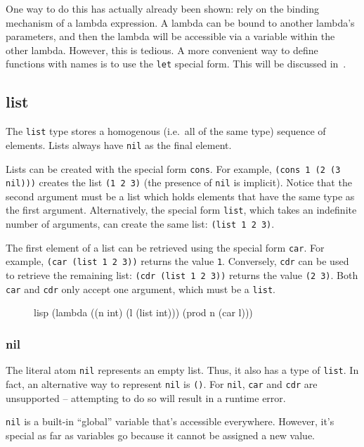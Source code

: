 One way to do this has actually already been shown: rely on the binding mechanism of a lambda expression. A lambda can be bound to another lambda's parameters, and then the lambda will be accessible via a variable within the other lambda. However, this is tedious. A more convenient way to define functions with names is to use the \texttt{let} special form. This will be discussed in~.

\subsection{list}
The \texttt{list} type stores a homogenous (i.e.\ all of the same type) sequence of elements. Lists always have \texttt{nil} as the final element.

Lists can be created with the special form \texttt{cons}. For example, \texttt{(cons 1 (2 (3 nil)))} creates the list \texttt{(1 2 3)} (the presence of \texttt{nil} is implicit). Notice that the second argument must be a list which holds elements that have the same type as the first argument. Alternatively, the special form \texttt{list}, which takes an indefinite number of arguments, can create the same list: \texttt{(list 1 2 3)}.

The first element of a list can be retrieved using the special form \texttt{car}. For example, \texttt{(car (list 1 2 3))} returns the value \texttt{1}. Conversely, \texttt{cdr} can be used to retrieve the remaining list: \texttt{(cdr (list 1 2 3))} returns the value \texttt{(2 3)}. Both \texttt{car} and \texttt{cdr} only accept one argument, which must be a \texttt{list}.

\begin{figure}[htp]
    \centering
    \begin{cminted}[autogobble=true]{lisp}
        (lambda ((n int) (l (list int)))
          (prod n (car l)))
    \end{cminted}
    \captionsetup[figure]{font=small}
\end{figure}

\subsubsection{nil}
The literal atom \texttt{nil} represents an empty list. Thus, it also has a type of \texttt{list}. In fact, an alternative way to represent \texttt{nil} is \texttt{()}. For \texttt{nil}, \texttt{car} and \texttt{cdr} are unsupported -- attempting to do so will result in a runtime error.

\texttt{nil} is a built-in ``global'' variable that's accessible everywhere. However, it's special as far as variables go because it cannot be assigned a new value.
